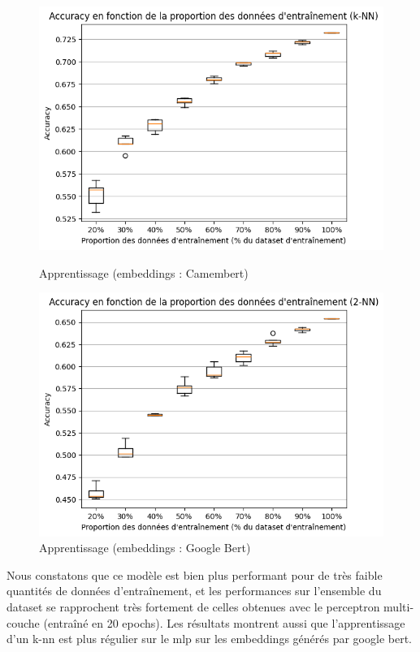\documentclass[12pt]{article}
\begin{document}
\begin{figure}[H]
    \centering
    \begin{minipage}[b]{0.45\textwidth}
        \centering
        \includegraphics[width=\textwidth]{static/knn_cam_2.png} 
        \caption{Apprentissage (embeddings : Camembert)}
        \label{fig:camenbert}
    \end{minipage}
    \hfill
    \begin{minipage}[b]{0.45\textwidth}
        \centering
        \includegraphics[width=\textwidth]{static/knn_goo_2.png} 
        \caption{Apprentissage (embeddings : Google Bert)}
        \label{fig:google_bert}
    \end{minipage}
\end{figure}

Nous constatons que ce modèle est bien plus performant pour de très faible quantités de données 
d'entraînement, et les performances sur l'ensemble du dataset se rapprochent très fortement de celles 
obtenues avec le perceptron multi-couche (entraîné en 20 epochs). Les résultats montrent aussi que l'apprentissage 
d'un k-nn est plus régulier sur le mlp sur les embeddings générés par google bert.
\end{document}
